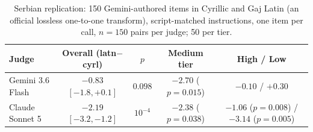 \begin{table}[H]
\centering\small
\caption{Serbian replication: 150 Gemini-authored items in Cyrillic and Gaj Latin (an official lossless one-to-one transform), script-matched instructions, one item per call, $n{=}150$ pairs per judge; 50 per tier.}
\begin{tabular}{lcccc}
\toprule
Judge & Overall (latn$-$cyrl) & $p$ & Medium tier & High / Low \\
\midrule
Gemini 3.6 Flash & $-0.83$ {\scriptsize$[-1.8, +0.1]$} & $0.098$ & $-2.70$ ($p{=}0.015$) & $-0.10$ / $+0.30$ \\
Claude Sonnet 5 & $\mathbf{-2.19}$ {\scriptsize$[-3.2, -1.2]$} & $10^{-4}$ & $-2.38$ ($p{=}0.038$) & $-1.06$ ($p{=}0.008$) / $-3.14$ ($p{=}0.005$) \\
\bottomrule
\end{tabular}
\end{table}

